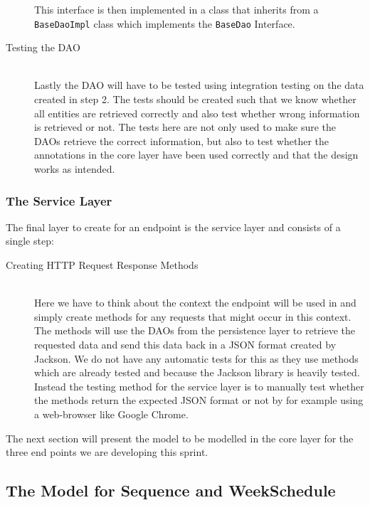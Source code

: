 \begin{description}
	This interface is then implemented in a class that inherits from a \texttt{BaseDaoImpl} class which implements the \texttt{BaseDao} Interface.
	\item[Testing the DAO] \hfill \\
	Lastly the DAO will have to be tested using integration testing on the data created in step 2.
	The tests should be created such that we know whether all entities are retrieved correctly and also test whether wrong information is retrieved or not.
	The tests here are not only used to make sure the DAOs retrieve the correct information, but also to test whether the annotations in the core layer have been used correctly and that the design works as intended.
\end{description}

\subsubsection{The Service Layer}

The final layer to create for an endpoint is the service layer and consists of a single step:
\begin{description}
	\item[Creating HTTP Request Response Methods]\hfill \\
	Here we have to think about the context the endpoint will be used in and simply create methods for any requests that might occur in this context.
	The methods will use the DAOs from the persistence layer to retrieve the requested data and send this data back in a JSON format created by Jackson.
	We do not have any automatic tests for this as they use methods which are already tested and because the Jackson library is heavily tested.
	Instead the testing method for the service layer is to manually test whether the methods return the expected JSON format or not by for example using a web-browser like Google Chrome.
\end{description}

The next section will present the model to be modelled in the core layer for the three end points we are developing this sprint.

\subsection{The Model for Sequence and WeekSchedule}


